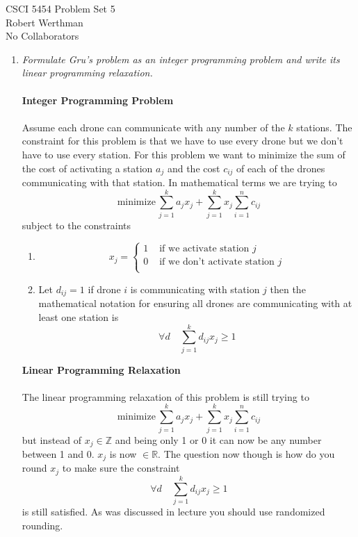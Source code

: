 \documentclass[12pt]{article}
\begin{document}
CSCI 5454 \hfill Problem Set 5\\
Robert Werthman\\
No Collaborators

\hrulefill

\begin{enumerate}
  
  \item \textit{Formulate Gru's problem as an integer programming problem and
  write its linear programming relaxation.}\\
  \\
  \textbf{Integer Programming Problem}\\
  \\
  Assume each drone can communicate with any number of the $k$ stations. The
  constraint for this problem is that we have to use every drone but we don't
  have to use every station.  For this problem we want to minimize the sum of
  the cost of activating a station $a_j$ and the cost $c_{ij}$ of each of the
  drones communicating with that station.  In mathematical terms we are trying to 
  $$ 
  \text{minimize} \,\sum_{j=1}^{k} a_jx_j + \sum_{j = 1}^{k} x_j\sum_{i=1}^{n}
  c_{ij} $$ 
  subject to the constraints
  \begin{enumerate} 
  \item
  $$
  x_j = 
  \begin{cases}
  1 & \text{ if we activate station }j\\
  0 & \text{ if we don't activate station }j\\
  \end{cases}
  $$
  \item
  Let $d_{ij} = 1$ if drone $i$ is communicating with station $j$ 
  then the mathematical notation for ensuring all drones are communicating with
  at least one station is 
  $$
  \forall d \quad \sum_{j=1}^{k} d_{ij}x_j \ge 1
  $$
  \end{enumerate}

  \textbf{Linear Programming Relaxation}\\
  \\
  The linear programming relaxation of this problem is still trying to
  $$ 
  \text{minimize} \,\sum_{j=1}^{k} a_jx_j + \sum_{j = 1}^{k} x_j\sum_{i=1}^{n}
  c_{ij} $$
  but instead of $x_j \in \mathbb{Z}$ and being only 1 or 0 it can now be any
  number between 1 and 0.  $x_j$ is now $\in \mathbb{R}$.  The question now
  though is how do you round $x_j$ to make sure the constraint
  $$
  \forall d \quad \sum_{j=1}^{k} d_{ij}x_j \ge 1
  $$
  is still satisfied.  As was discussed in lecture you should use randomized
  rounding.
  

\end{enumerate}
\end{document}
